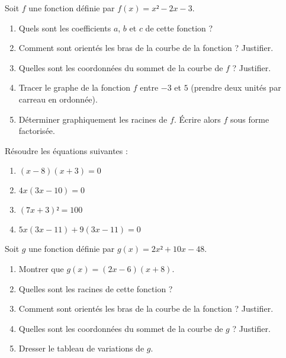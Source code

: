 \documentclass[
	classe=$1^{ere}STI2D$,
	headerTitle=Évaluation\space Chapitre\space 4
]{évaluation}
\begin{document}
\begin{exercice}
	Soit $f$ une fonction définie par $f(x) = x² - 2x - 3$.
	\begin{enumerate}
		\item Quels sont les coefficients $a$, $b$ et $c$ de cette fonction ?
		\item Comment sont orientés les bras de la courbe de la fonction ? Justifier.
		\item Quelles sont les coordonnées du sommet de la courbe de $f$ ? Justifier.
		\item Tracer le graphe de la fonction $f$ entre $-3$ et $5$ (prendre deux unités par carreau en ordonnée).
		\item Déterminer graphiquement les racines de $f$. Écrire alors $f$ sous forme factorisée.
	\end{enumerate}
\end{exercice}

\begin{exercice}
	Résoudre les équations suivantes :
	\begin{enumerate}
		\item $(x - 8)(x + 3) = 0$
		\item $4x(3x - 10) = 0$
		\item $(7x + 3)² = 100$
		\item $5x(3x - 11) + 9(3x - 11) = 0$
	\end{enumerate}
\end{exercice}

\begin{exercice}
	Soit $g$ une fonction définie par $g(x) = 2x² + 10x - 48$.
	\begin{enumerate}
		\item Montrer que $g(x) = (2x - 6)(x + 8)$.
		\item Quelles sont les racines de cette fonction ?
		\item Comment sont orientés les bras de la courbe de la fonction ? Justifier.
		\item Quelles sont les coordonnées du sommet de la courbe de $g$ ? Justifier.
		\item Dresser le tableau de variations de $g$.
	\end{enumerate}
\end{exercice}
\end{document}
